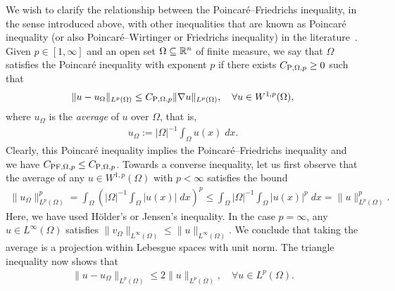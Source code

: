 \documentclass[10pt,letterpaper]{article}
\begin{document}
We wish to clarify the relationship between the Poincar\'e--Friedrichs inequality, in the sense introduced above, with other inequalities that are known as Poincar\'e inequality (or also Poincar\'e--Wirtinger or Friedrichs inequality) in the literature~\cite{ern2021finite}. Given $p \in [1,\infty]$ and an open set $\Omega \subseteq {\mathbb R}^{n}$ of finite measure, 
we say that $\Omega$ satisfies the Poincar\'e inequality with exponent $p$ 
if there exists $C_{{{\rm P}},\Omega,p} \geq 0$ such that 
\begin{align*}
    \| u - u_{\Omega} \|_{L^{p}(\Omega)}
    \leq 
    C_{{\rm P},\Omega,p} 
    \| \nabla u \|_{L^{p}(\Omega)}
    ,
    \quad 
    \forall u \in W^{1,p}(\Omega)
    ,
\end{align*}
where $u_{\Omega}$ is the \emph{average} of $u$ over $\Omega$, that is,
\begin{align*}
    u_{\Omega} := |\Omega|^{-1} \int_{\Omega} u(x) \;dx.
\end{align*}
Clearly, this Poincar\'e inequality implies the Poincar\'e--Friedrichs inequality and we have $C_{{\rm{PF}},\Omega,p} \leq C_{{\rm P},\Omega,p}$. 
Towards a converse inequality, 
let us first observe that the average of any $u \in W^{1,p}(\Omega)$ with $p < \infty$ satisfies the bound 
\begin{align*}
    \| u_\Omega \|_{L^{p}(\Omega)}^{p}
    = 
    \int_{\Omega} \left( |\Omega|^{-1} \int_{\Omega} |u(x)| \;dx \right)^{p}
    \leq 
    \int_{\Omega} |\Omega|^{-1} \int_{\Omega} |u(x)|^{p} \;dx
    = 
    \| u \|_{L^{p}(\Omega)}^{p}
    .
\end{align*}
Here, we have used H\"older's or Jensen's inequality. 
In the case $p = \infty$, any $u \in L^{\infty}(\Omega)$ satisfies $\| v_\Omega \|_{L^{\infty}(\Omega)} \leq \| u \|_{L^{\infty}(\Omega)}$. 
We conclude that taking the average is a projection within Lebesgue spaces with unit norm. 
The triangle inequality now shows that 
\begin{align*}
    \| u - u_\Omega \|_{L^{p}(\Omega)} 
    \leq
    2
    \| u \|_{L^{p}(\Omega)},
    \quad 
    \forall
    u \in L^{p}(\Omega)
    .
\end{align*}
\end{document}
